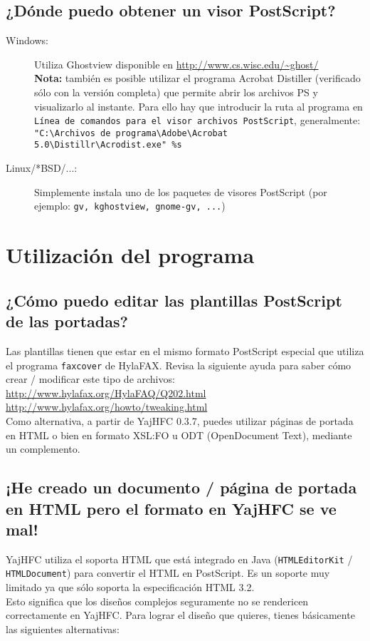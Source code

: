 \documentclass[a4paper,10pt]{scrartcl}
\begin{document}
\subsection{¿Dónde puedo obtener un visor PostScript?}
\begin{description}
\item[Windows:] Utiliza Ghostview disponible en
\url{http://www.cs.wisc.edu/~ghost/}\\
\textbf{Nota:} también es posible utilizar el programa Acrobat Distiller
(verificado sólo con la versión completa) que permite abrir los archivos PS
y visualizarlo al instante. Para ello hay que introducir la ruta al programa
en \texttt{Línea de comandos para el visor archivos PostScript},
generalmente:
\verb#"C:\Archivos de programa\Adobe\Acrobat 5.0\Distillr\Acrodist.exe" %s#

\item[Linux/*BSD/...:] Simplemente instala uno de los paquetes de visores
PostScript
(por ejemplo: \texttt{gv, kghostview, gnome-gv, ...})
\end{description}


\section{Utilización del programa}	

\subsection{¿Cómo puedo editar las plantillas PostScript de las portadas?}
Las plantillas tienen que estar en el mismo formato PostScript especial 
que utiliza el programa \texttt{faxcover} de HylaFAX. Revisa la siguiente ayuda 
para saber cómo crear / modificar este tipo de archivos: \\
\url{http://www.hylafax.org/HylaFAQ/Q202.html}\\
\url{http://www.hylafax.org/howto/tweaking.html}\\

Como alternativa, a partir de YajHFC 0.3.7, puedes utilizar páginas de portada en HTML o bien en formato XSL:FO u ODT (OpenDocument Text), mediante un complemento.

\subsection{¡He creado un documento / página de portada en HTML pero el formato en YajHFC se ve mal!}

YajHFC utiliza el soporta HTML que está integrado en Java (\texttt{HTMLEditorKit} / \texttt{HTMLDocument}) para convertir el HTML en PostScript. Es un soporte muy limitado ya que sólo soporta la especificación HTML 3.2.\\
Esto significa que los diseños complejos seguramente no se rendericen correctamente en YajHFC.
Para lograr el diseño que quieres, tienes básicamente las siguientes alternativas:
\end{document}
